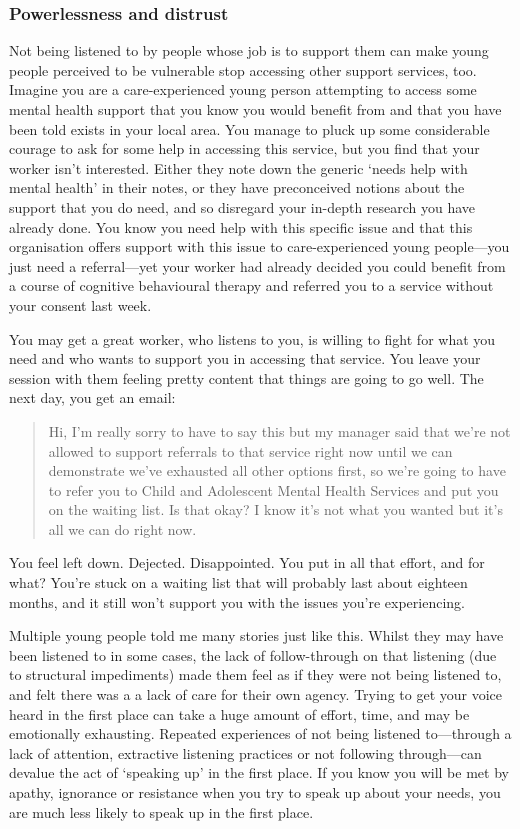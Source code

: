 \subsubsection{Powerlessness and distrust}
Not being listened to by people whose job is to support them can make young people perceived to be vulnerable stop accessing other support services, too. Imagine you are a care-experienced young person attempting to access some mental health support that you know you would benefit from and that you have been told exists in your local area. You manage to pluck up some considerable courage to ask for some help in accessing this service, but you find that your worker isn't interested. Either they note down the generic `needs help with mental health' in their notes, or they have preconceived notions about the support that you do need, and so disregard your in-depth research you have already done. You know you need help with this specific issue and that this organisation offers support with this issue to care-experienced young people—you just need a referral—yet your worker had already decided you could benefit from a course of cognitive behavioural therapy and referred you to a service without your consent last week.

You may get a great worker, who listens to you, is willing to fight for what you need and who wants to support you in accessing that service. You leave your session with them feeling pretty content that things are going to go well. The next day, you get an email:
\begin{quote}
Hi, I'm really sorry to have to say this but my manager said that we’re not allowed to support referrals to that service right now until we can demonstrate we’ve exhausted all other options first, so we’re going to have to refer you to Child and Adolescent Mental Health Services and put you on the waiting list. Is that okay? I know it's not what you wanted but it's all we can do right now.
\end{quote}
You feel left down. Dejected. Disappointed. You put in all that effort, and for what? You’re stuck on a waiting list that will probably last about eighteen months, and it still won’t support you with the issues you’re experiencing. 

Multiple young people told me many stories just like this. Whilst they may have been listened to in some cases, the lack of follow-through on that listening (due to structural impediments) made them feel as if they were not being listened to, and felt there was a a lack of care for their own agency. Trying to get your voice heard in the first place can take a huge amount of effort, time, and may be emotionally exhausting. Repeated experiences of not being listened to—through a lack of attention, extractive listening practices or not following through—can devalue the act of `speaking up' in the first place. If you know you will be met by apathy, ignorance or resistance when you try to speak up about your needs, you are much less likely to speak up in the first place.

